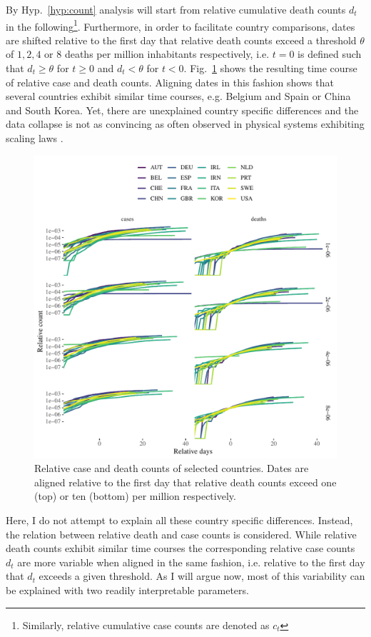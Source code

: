 \documentclass[fullpage,a4paper]{article}
\newcommand{\fig}[1]{Fig.~\ref{fig:#1}}
\newcommand{\hyp}[1]{Hyp.~\ref{hyp:#1}}
\begin{document}
By \hyp{count} analysis will start from relative cumulative death
counts $d_t$ in the following\footnote{Similarly, relative cumulative
  case counts are denoted as $c_t$}. Furthermore, in order to
facilitate country comparisons, dates are shifted relative to the
first day that relative death counts exceed a threshold $\theta$ of
$1, 2, 4$ or $8$ deaths per million inhabitants respectively, i.e. $t
= 0$ is defined such that $d_t \geq \theta$ for $t \geq 0$ and $d_t <
\theta$ for $t < 0$. \fig{aligned_data} shows the resulting time
course of relative case and death counts. Aligning dates in this
fashion shows that several countries exhibit similar time courses,
e.g. Belgium and Spain or China and South Korea. Yet, there are
unexplained country specific differences and the data collapse is not
as convincing as often observed in physical systems exhibiting scaling
laws \cite{stanley99}.
\begin{figure}
  \includegraphics[width=1\textwidth]{../figs/ecdc_align_all.pdf}
  \caption{\label{fig:aligned_data} Relative case and death counts of
    selected countries. Dates are aligned relative to the first day
    that relative death counts exceed one (top) or ten (bottom) per
    million respectively.}
\end{figure}

Here, I do not attempt to explain all these country specific
differences. Instead, the relation between relative death and case
counts is considered. While relative death counts exhibit similar time
courses the corresponding relative case counts $d_t$ are more variable
when aligned in the same fashion, i.e. relative to the first day that
$d_t$ exceeds a given threshold. As I will argue now, most of this
variability can be explained with two readily interpretable
parameters.
\end{document}
